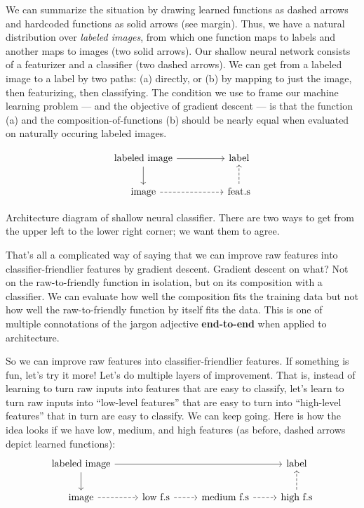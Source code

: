 We can summarize the situation by drawing learned functions as dashed arrows
and hardcoded functions as solid arrows (see margin).
Thus, we have a natural distribution over \emph{labeled images}, from which
one function maps to labels and another maps to images (two solid arrows).  Our
shallow neural network consists of a featurizer and a classifier (two dashed
arrows).  We can get from a labeled image to a label by two paths: (a) directly,
or (b) by mapping to just the image, then featurizing, then classifying.  The
condition we use to frame our machine learning problem ---
and the objective of gradient descent --- is that the function (a) and the
composition-of-functions (b) should be nearly equal when evaluated on naturally
occuring labeled images.
\begin{marginfigure}[-3.5cm]
$$
{\normalsize
\begin{tikzcd}
\text{labeled image} \arrow[d] \arrow[rr] &  & \text{label}                    \\
\text{image} \arrow[rr, dashed]           &  & \text{feat.s} \arrow[u, dashed]
\end{tikzcd}
}
$$
\caption{Architecture diagram of shallow neural classifier.  There are two ways to get from the upper left to the lower right corner; we want them to agree.}
\end{marginfigure}
That's all a complicated way of saying that we can improve raw features into
classifier-friendlier features by gradient descent.  Gradient descent on
what?  Not on the raw-to-friendly function in isolation, but on its composition
with a classifier.  We can evaluate how well the composition fits the training
data but not how well the raw-to-friendly function by itself fits the data.
This is one of multiple connotations
of the jargon adjective \textbf{end-to-end} when applied to architecture.

So we can improve raw features into classifier-friendlier features.  If
something is fun, let's try it more!  Let's do multiple layers of improvement.
That is, instead of learning to turn raw inputs into features that are easy
to classify, let's learn to turn raw inputs into ``low-level features'' that
are easy to turn into ``high-level features'' that in turn are easy to classify.
We can keep going.  Here is how the idea looks if we have low, medium, and
high features (as before, dashed arrows
depict learned functions):
$$
\begin{tikzcd}
\text{labeled image} \arrow[rrr] \arrow[d] &                                  &                                     & \text{label}                      \\
\text{image} \arrow[r, dashed]             & \text{low f.s} \arrow[r, dashed] & \text{medium f.s} \arrow[r, dashed] & \text{high f.s} \arrow[u, dashed]
\end{tikzcd}
$$

